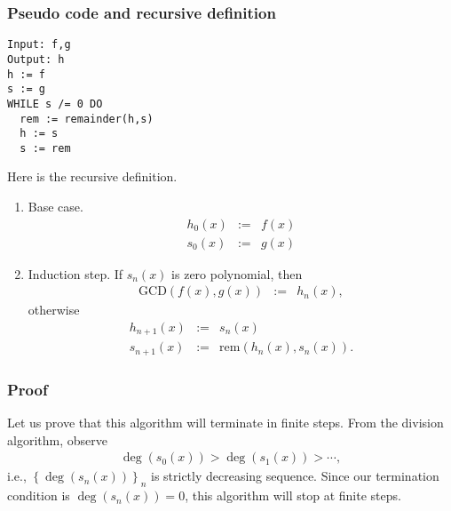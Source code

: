 \documentclass[11pt]{book}
\begin{document}
\subsubsection{Pseudo code and recursive definition}
\begin{verbatim}
Input: f,g
Output: h
h := f
s := g
WHILE s /= 0 DO
  rem := remainder(h,s)
  h := s
  s := rem
\end{verbatim}

Here is the recursive definition.
\begin{enumerate}
\item Base case.
\begin{eqnarray}
h_0(x) &:=& f(x) \\
s_0(x) &:=& g(x) %
\end{eqnarray}

\item Induction step.
If $s_n(x)$ is zero polynomial, then
\begin{eqnarray}
\text{GCD}\left( f(x), g(x) \right) &:=& h_n(x),
\end{eqnarray}
otherwise
\begin{eqnarray}
h_{n+1}(x) &:=& s_n(x) \\
s_{n+1}(x) &:=& \text{rem}\left( h_n(x), s_n(x) \right) .
\end{eqnarray}

\end{enumerate}

\subsubsection{Proof}
Let us prove that this algorithm will terminate in finite steps.
From the division algorithm, observe
\begin{eqnarray}
\deg\left( s_0(x) \right) > \deg\left( s_1(x) \right) > \cdots,
\end{eqnarray}
i.e., $\left\{ \deg\left( s_n(x) \right) \right\}_n$ is strictly decreasing sequence.
Since our termination condition is $\deg\left( s_n(x) \right)=0$, this algorithm will stop at finite steps.
\end{document}
